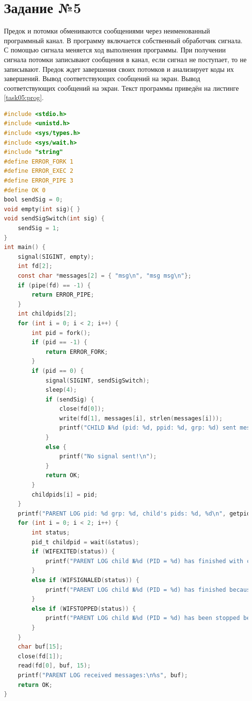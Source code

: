 \documentclass[12pt]{report}
\begin{document}
\section*{Задание №5}
Предок и потомки обмениваются сообщениями через неименованный программный канал. В программу включается собственный обработчик сигнала. С помощью сигнала меняется ход выполнения программы. При получении сигнала потомки записывают сообщения в канал, если сигнал не поступает, то не записывают. Предок ждет завершения своих потомков и анализирует коды их завершений. Вывод соответствующих сообщений на экран. Вывод соответствующих сообщений на экран. Текст программы приведён на листинге \ref{task05:prog}.

\begin{lstlisting}[label=task05:prog,caption=Использование сигналов,language=C]
#include <stdio.h>
#include <unistd.h>
#include <sys/types.h>
#include <sys/wait.h>
#include "string"
#define ERROR_FORK 1
#define ERROR_EXEC 2
#define ERROR_PIPE 3
#define OK 0
bool sendSig = 0;
void empty(int sig){ }
void sendSigSwitch(int sig) {
    sendSig = 1;
}
int main() {
    signal(SIGINT, empty);
    int fd[2];
    const char *messages[2] = { "msg\n", "msg msg\n"};
    if (pipe(fd) == -1) {
        return ERROR_PIPE;
    }
    int childpids[2];
    for (int i = 0; i < 2; i++) {
        int pid = fork();
        if (pid == -1) {
            return ERROR_FORK;
        }
        if (pid == 0) {
            signal(SIGINT, sendSigSwitch);
            sleep(4);
            if (sendSig) {
                close(fd[0]);
                write(fd[1], messages[i], strlen(messages[i]));
                printf("CHILD №%d (pid: %d, ppid: %d, grp: %d) sent message to parent\n", i + 1, getpid(), getppid(), getpgrp());
            }
            else {
                printf("No signal sent!\n");
            }
            return OK;
        }
        childpids[i] = pid;
    }
    printf("PARENT LOG pid: %d grp: %d, child's pids: %d, %d\n", getpid(), getpgrp(), childpids[0], childpids[1]);
    for (int i = 0; i < 2; i++) {
        int status;
        pid_t childpid = wait(&status);
        if (WIFEXITED(status)) {
            printf("PARENT LOG child №%d (PID = %d) has finished with code: %d\n", i + 1, childpid, WEXITSTATUS(status));
        }
        else if (WIFSIGNALED(status)) {
            printf("PARENT LOG child №%d (PID = %d) has finished because of signal: %d\n", i + 1, childpid, WTERMSIG(status));
        }
        else if (WIFSTOPPED(status)) {
            printf("PARENT LOG child №%d (PID = %d) has been stopped because of signal: %d\n", i + 1, childpid, WSTOPSIG(status));
        }
    }
    char buf[15];
    close(fd[1]);
    read(fd[0], buf, 15);
    printf("PARENT LOG received messages:\n%s", buf);
    return OK;
}
\end{lstlisting}
\end{document}
